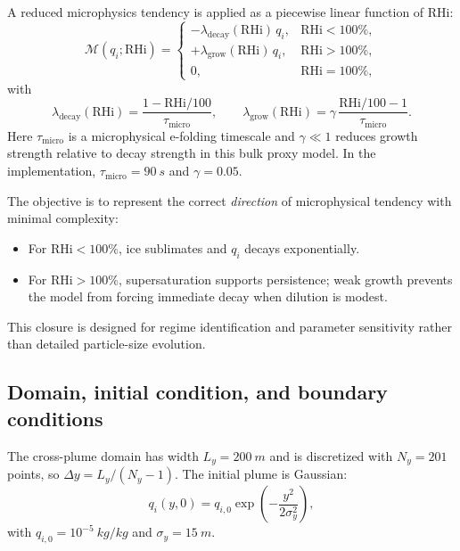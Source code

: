 \documentclass[11pt]{article}
\begin{document}
A reduced microphysics tendency is applied as a piecewise linear function of RHi:
\begin{equation}
\mathcal{M}(q_i;\mathrm{RHi})=
\begin{cases}
-\lambda_{\mathrm{decay}}(\mathrm{RHi})\,q_i, & \mathrm{RHi}<100\%,\\[4pt]
+\lambda_{\mathrm{grow}}(\mathrm{RHi})\,q_i, & \mathrm{RHi}>100\%,\\[4pt]
0, & \mathrm{RHi}=100\%,
\end{cases}
\label{eq:micro_piecewise}
\end{equation}
with
\begin{equation}
\lambda_{\mathrm{decay}}(\mathrm{RHi})=\dfrac{1-\mathrm{RHi}/100}{\tau_{\mathrm{micro}}},
\qquad
\lambda_{\mathrm{grow}}(\mathrm{RHi})=\gamma\,\dfrac{\mathrm{RHi}/100-1}{\tau_{\mathrm{micro}}}.
\label{eq:micro_rates}
\end{equation}
Here $\tau_{\mathrm{micro}}$ is a microphysical e-folding timescale and $\gamma\ll 1$ reduces
growth strength relative to decay strength in this bulk proxy model. In the implementation,
$\tau_{\mathrm{micro}}=90~\si{s}$ and $\gamma=0.05$.

The objective is to represent the correct \emph{direction} of microphysical tendency with minimal
complexity:
\begin{itemize}
\item For $\mathrm{RHi}<100\%$, ice sublimates and $q_i$ decays exponentially.
\item For $\mathrm{RHi}>100\%$, supersaturation supports persistence; weak growth prevents the model from
forcing immediate decay when dilution is modest.
\end{itemize}
This closure is designed for regime identification and parameter sensitivity rather than detailed
particle-size evolution.

\subsection{Domain, initial condition, and boundary conditions}
\label{sec:matlab_bc}

The cross-plume domain has width $L_y=200~\si{m}$ and is discretized with $N_y=201$ points,
so $\Delta y=L_y/(N_y-1)$. The initial plume is Gaussian:
\begin{equation}
q_i(y,0)=q_{i,0}\exp\!\left(-\frac{y^2}{2\sigma_y^2}\right),
\label{eq:ic}
\end{equation}
with $q_{i,0}=10^{-5}~\si{kg/kg}$ and $\sigma_y=15~\si{m}$.
\end{document}

